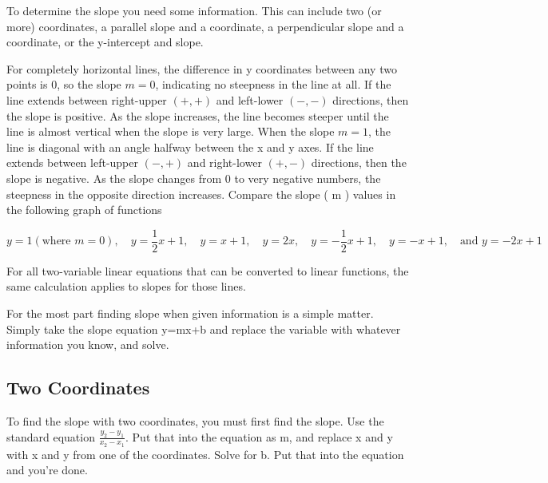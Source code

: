 To determine the slope you need some information. This can include two (or more)
coordinates, a parallel slope and a coordinate, a perpendicular slope and a coordinate, or
the y-intercept and slope.



For completely horizontal lines, the difference in y coordinates between any two points is
0, so the slope $m = 0$, indicating no steepness in the line at all. If the line extends
between right-upper $(+,+)$ and left-lower $( -, -)$ directions, then the slope is
positive. As the slope increases, the line becomes steeper until the line is almost
vertical when the slope is very large. When the slope $m = 1$, the line is diagonal with
an angle halfway between the x and y axes. If the line extends between left-upper $(-,+)$
and right-lower $(+, -)$ directions, then the slope is negative. As the slope changes from
0 to very negative numbers, the steepness in the opposite direction increases. Compare the
slope ( m ) values in the following graph of functions

$$y = 1 ( \text{where } m = 0), \quad y = \frac{1}{2} x + 1, \quad y = x + 1, \quad y = 2 x, \quad y = -\frac{1}{2} x + 1, \quad y = -x + 1, \quad \text{and } y = -2 x + 1$$

For all two-variable linear equations that can be converted to linear functions, the same
calculation applies to slopes for those lines.






For the most part finding slope when given information is a simple matter. Simply take the
slope equation y=mx+b and replace the variable with whatever information you know, and
solve.




\subsection{Two Coordinates}
\label{sss:twoc-24d3}




To find the slope with two coordinates, you must first find the slope. Use the standard
equation $\frac{y _2-y _1}{x _2-x _1}$. Put that into the equation as m, and replace x and
y with x and y from one of the coordinates. Solve for b. Put that into the equation and
you're done.



